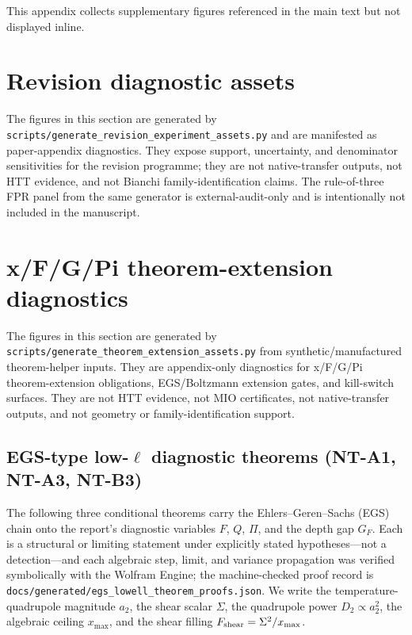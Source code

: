 This appendix collects supplementary figures referenced in
the main text but not displayed inline.

\section{Revision diagnostic assets}
\label{app:revision-diagnostic-assets}

The figures in this section are generated by
\texttt{scripts/generate\_revision\_experiment\_assets.py} and are
manifested as paper-appendix diagnostics.  They expose support,
uncertainty, and denominator sensitivities for the revision programme;
they are not native-transfer outputs, not HTT evidence, and not
Bianchi family-identification claims.  The rule-of-three FPR panel from
the same generator is external-audit-only and is intentionally not
included in the manuscript.



\section{x/F/G/Pi theorem-extension diagnostics}
\label{app:theorem-extension-diagnostics}

The figures in this section are generated by
\texttt{scripts/generate\_theorem\_extension\_assets.py} from
synthetic/manufactured theorem-helper inputs.  They are
appendix-only diagnostics for x/F/G/Pi theorem-extension
obligations, EGS/Boltzmann extension gates, and kill-switch
surfaces.  They are not HTT evidence, not MIO certificates, not
native-transfer outputs, and not geometry or family-identification
support.



\subsection{EGS-type low-$\ell$ diagnostic theorems (NT-A1, NT-A3,
NT-B3)}\label{sec:egs-lowell-theorems}

The following three conditional theorems carry the
Ehlers--Geren--Sachs (EGS) chain onto the report's diagnostic
variables $F$, $Q$, $\Pi$, and the depth gap $G_F$.  Each is a
structural or limiting statement under explicitly stated
hypotheses---not a detection---and each algebraic step, limit, and
variance propagation was verified symbolically with the Wolfram
Engine; the machine-checked proof record is
\texttt{docs/generated/egs\_lowell\_theorem\_proofs.json}.  We write
the temperature-quadrupole magnitude $a_2$, the shear scalar
$\Sigma$, the quadrupole power $D_2\propto a_2^2$, the algebraic
ceiling $x_{\max}$, and the shear filling $F_{\rm shear} =
\Sigma^2/x_{\max}$.

